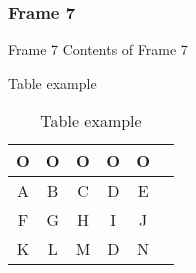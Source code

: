 \documentclass[12pt]{beamer}
\begin{document}
\begin{frame}[shrink]
\frametitle{Frame 7}
\begin{block}{Frame 7}
\pause
Contents of Frame 7

Table example

\begin{table}
\begin{tabular}{c|c|c|c|c|c}
O & O & O & O & O\\
\hline \hline
A & B & C & D & E \\
F & G & H & I & J \\
K & L & M & D & N \\
\end{tabular}
\caption{Table example}
\end{table}

\end{block}
\end{frame}
\end{document}
